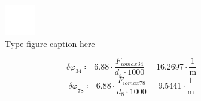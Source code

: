 \documentclass{article}
\newcommand{\defeq}{\coloneq} %
\begin{document}
\begin{figure}[h!]
 \begin{center}
  \includegraphics[max width=\textwidth]{calculations/828.png}
  \caption{Type figure caption here}
  \label{fig:828}
 \end{center}
\end{figure}
\begin{equation*}
\textit{δφ}_{\textit{34}} \defeq 6.88 \cdot \frac{\textit{F}_{\textit{iomax34}}}{\textit{d}_{\textit{4}} \cdot 1000} = {16.2697 \cdot \frac{1}{\mathrm{m}}}
\end{equation*}
\begin{equation*}
\textit{δφ}_{\textit{78}} \defeq 6.88 \cdot \frac{\textit{F}_{\textit{iomax78}}}{\textit{d}_{\textit{8}} \cdot 1000} = {9.5441 \cdot \frac{1}{\mathrm{m}}}
\end{equation*}
\end{document}
